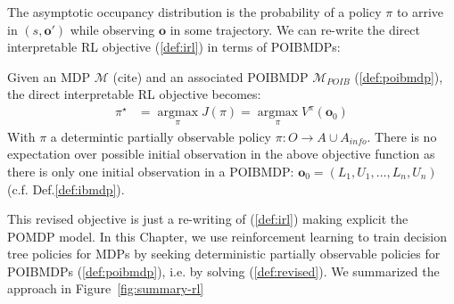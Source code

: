 The asymptotic occupancy distribution is the probability of a policy $\pi$ to arrive in $(s,\boldsymbol{o}')$ while observing $\boldsymbol{o}$ in some trajectory.  
We can re-write the direct interpretable RL objective (\ref{def:irl}) in terms of POIBMDPs:

\begin{definition}\label{def:revised}
    Given an MDP $\mathcal{M}$ (cite) and an associated POIBMDP $\mathcal{M}_{POIB}$ (\ref{def:poibmdp}), the direct interpretable RL objective becomes:
\begin{align}
    \pi^{\star} &= \underset{\pi}{\operatorname{argmax}}J(\pi) = \underset{\pi}{\operatorname{argmax}}V^{\pi}(\boldsymbol{o}_0)
\end{align}
With $\pi$ a determintic partially observable policy $\pi:O\rightarrow A\cup A_{info}$. There is no expectation over possible initial observation in the above objective function as there is only one initial observation in a POIBMDP: $\boldsymbol{o}_0=(L_1, U_1, \dots, L_n, U_n)$ (c.f. Def.\ref{def:ibmdp}).
\end{definition}
This revised objective is just a re-writing of (\ref{def:irl}) making explicit the POMDP model.
In this Chapter, we use reinforcement learning to train decision tree policies for MDPs by seeking deterministic partially observable policies for POIBMDPs (\ref{def:poibmdp}), i.e. by solving (\ref{def:revised}).
We summarized the approach in Figure~\ref{fig:summary-rl}  

